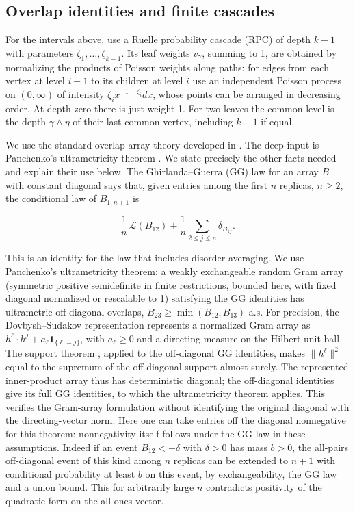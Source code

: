 \documentclass[11pt]{article}
\begin{document}
\subsection{Overlap identities and finite cascades}

For the intervals above, use a Ruelle probability cascade (RPC) \cite[Section~3]{Ruelle1987} of depth $k-1$ with parameters $\zeta_1,\ldots,\zeta_{k-1}$. Its leaf weights $v_\gamma$, summing to 1, are obtained by normalizing the products of Poisson weights along paths: for edges from each vertex at level $i-1$ to its children at level $i$ use an independent Poisson process on $(0,\infty)$ of intensity $\zeta_i x^{-1-\zeta_i}dx$, whose points can be arranged in decreasing order. At depth zero there is just weight 1. For two leaves the common level is the depth $\gamma\wedge\eta$ of their last common vertex, including $k-1$ if equal.

We use the standard overlap-array theory developed in \cite{Panchenko2013Book,Panchenko2013Ultrametricity}. The deep input is Panchenko's ultrametricity theorem \cite[Theorem~1]{Panchenko2013Ultrametricity}. We state precisely the other facts needed and explain their use below. The Ghirlanda--Guerra (GG) law \cite{GhirlandaGuerra1998} for an array $B$ with constant diagonal says that, given entries among the first $n$ replicas, $n\ge2$, the conditional law of $B_{1,n+1}$ is

\begin{equation*}
\frac1n\,\mathcal L(B_{12})+\frac1n\sum_{2\le j\le n}\delta_{B_{1j}}.
\end{equation*}

This is an identity for the law that includes disorder averaging. We use Panchenko's ultrametricity theorem: a weakly exchangeable random Gram array (symmetric positive semidefinite in finite restrictions, bounded here, with fixed diagonal normalized or rescalable to 1) satisfying the GG identities has ultrametric off-diagonal overlaps, $B_{23}\ge\min(B_{12},B_{13})$ a.s. For precision, the Dovbysh--Sudakov representation
\cite[Proposition~1]{Panchenko2010DovbyshSudakov} represents a normalized
Gram array as $h^\ell\cdot h^j+a_\ell\mathbf1_{\{\ell=j\}}$, with
$a_\ell\ge0$ and a directing measure on the Hilbert unit ball.
The support theorem \cite[Theorem~2(a)]{Panchenko2010Support}, applied to
the off-diagonal GG identities, makes $\|h^\ell\|^2$ equal to the
supremum of the off-diagonal support almost surely. The represented
inner-product array thus has deterministic diagonal; the off-diagonal
identities give its full GG identities, to which the ultrametricity theorem
applies. This verifies the Gram-array formulation without identifying the
original diagonal with the directing-vector norm. Here one can take entries off the diagonal nonnegative for this theorem: nonnegativity itself follows under the GG law in these assumptions. Indeed if an event $B_{12}<-\delta$ with $\delta>0$ has mass $b>0$, the all-pairs off-diagonal event of this kind among $n$ replicas can be extended to $n+1$ with conditional probability at least $b$ on this event, by exchangeability, the GG law and a union bound. This for arbitrarily large $n$ contradicts positivity of the quadratic form on the all-ones vector.
\end{document}
